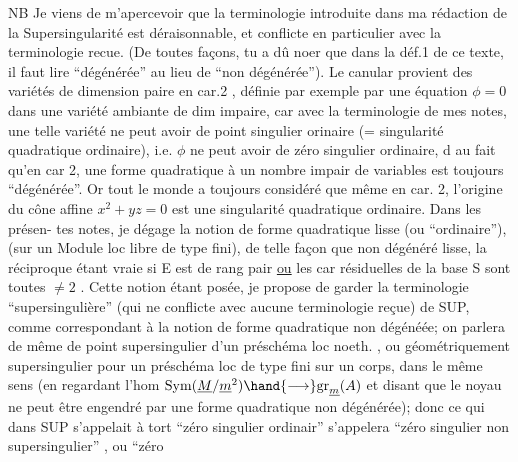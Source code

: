 NB Je viens de m'apercevoir que la terminologie introduite dans
ma rédaction  de la Supersingularité est déraisonnable, et conflicte
en particulier avec la terminologie recue. (De toutes façons, tu a dû
noer que dans la déf.1 de ce texte, il faut lire ``dégénérée'' au lieu de
``non dégénérée''). Le canular provient des variétés de dimension paire
en car.2 ,  définie par exemple par une équation $\phi=0$
dans une variété ambiante de dim impaire, car avec la terminologie de mes
notes, une telle variété ne peut avoir de  point singulier
orinaire (= singularité quadratique ordinaire), i.e. $\phi$ ne peut avoir
de zéro singulier ordinaire, d au fait qu'en car 2, une forme quadratique
à un nombre impair de variables est toujours ``dégénérée''. Or tout le
monde a toujours considéré que même en car. 2, l'origine du cône affine
$x^2 + yz = 0$ est une singularité quadratique ordinaire. Dans les présen-%
tes notes, je dégage la notion de forme quadratique lisse (ou ``ordinaire''),
(sur un Module loc libre de type fini), de telle façon que
non dégénéré \hand{$\Longrightarrow$} lisse, la réciproque étant vraie si E est de rang pair
\uline{ou} les car résiduelles de la base S sont toutes $\neq 2$ . Cette notion étant
posée, je propose de garder la terminologie ``supersingulière'' (qui ne
conflicte avec aucune terminologie reçue)  de SUP,
comme correspondant à la notion de forme quadratique non dégénéée; on
parlera de même de point supersingulier d'un préschéma loc noeth. , ou
géométriquement supersingulier pour un préschéma loc de type fini sur un
corps, dans le même sens (en regardant l'hom $\mathrm{Sym}(\underline{M}/\underline{m}^2) \hand{\longrightarrow} \mathrm{gr}_{\underline{m}}(A)$ et
 disant que le noyau ne peut être engendré par une forme quadratique
non dégénérée); donc ce qui dans SUP s'appelait à tort ``zéro singulier
ordinair'' s'appelera ``zéro singulier non supersingulier'' , ou ``zéro

